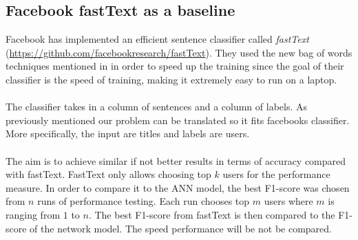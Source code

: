 \subsection{Facebook fastText as a baseline}
Facebook has implemented an efficient sentence classifier called \textit{fastText} (\url{https://github.com/facebookresearch/fastText}). They used the new bag of words techniques mentioned in \parencite{joulin2016bag} in order to speed up the training since the goal of their classifier is the speed of training, making it extremely easy to run on a laptop. 
\\\\
The classifier takes in a column of sentences and a column of labels. As previously mentioned our problem can be translated so it fits facebooks classifier. More specifically, the input are titles and labels are users. \\\\
The aim is to achieve similar if not better results in terms of accuracy compared with fastText.  FastText only allows choosing top $k$ users for the performance measure. In order to compare it to the ANN model, the best F1-score was chosen from $n$ runs of performance testing. Each run chooses top $m$ users where $m$ is ranging from $1$ to $n$. The best F1-score from fastText is then compared to the F1-score of the network model.
The speed performance will be not be compared.

